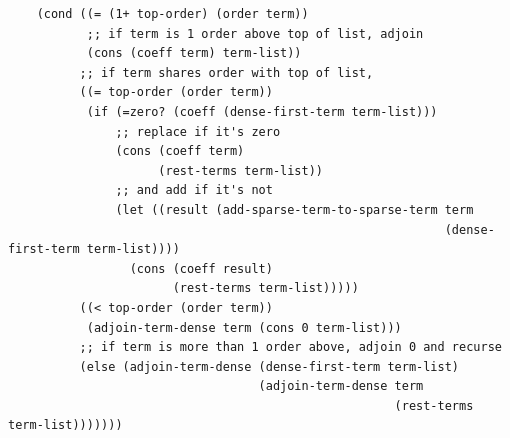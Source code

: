\documentclass[final,fleqn,titlepage,twoside]{article}
\begin{document}
\begin{verbatim}
    (cond ((= (1+ top-order) (order term))
           ;; if term is 1 order above top of list, adjoin
           (cons (coeff term) term-list))
          ;; if term shares order with top of list, 
          ((= top-order (order term))
           (if (=zero? (coeff (dense-first-term term-list)))
               ;; replace if it's zero
               (cons (coeff term)
                     (rest-terms term-list))
               ;; and add if it's not
               (let ((result (add-sparse-term-to-sparse-term term
                                                             (dense-first-term term-list))))
                 (cons (coeff result)
                       (rest-terms term-list)))))
          ((< top-order (order term))
           (adjoin-term-dense term (cons 0 term-list)))
          ;; if term is more than 1 order above, adjoin 0 and recurse
          (else (adjoin-term-dense (dense-first-term term-list)
                                   (adjoin-term-dense term
                                                      (rest-terms term-list)))))))


\end{verbatim}
\end{document}
